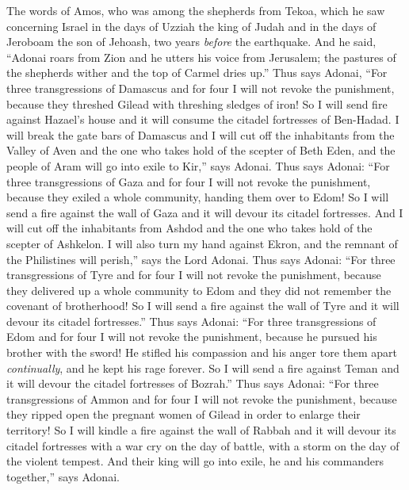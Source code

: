 
\begin{biblechapter} %
 The words of Amos, who was among the shepherds from Tekoa, which he saw concerning Israel in the days of Uzziah the king of Judah and in the days of Jeroboam the son of Jehoash, two years \textit{before} the earthquake.
 And he said, “Adonai roars from Zion and he utters his voice from Jerusalem; the pastures of the shepherds wither and the top of Carmel dries up.”
\verse Thus says Adonai, “For three transgressions of Damascus and for four I will not revoke the punishment, because they threshed Gilead with threshing sledges of iron!
\verse So I will send fire against Hazael’s house and it will consume the citadel fortresses of Ben-Hadad.
\verse I will break the gate bars of Damascus and I will cut off the inhabitants from the Valley of Aven and the one who takes hold of the scepter of Beth Eden, and the people of Aram will go into exile to Kir,” says Adonai.
\verse Thus says Adonai: “For three transgressions of Gaza and for four I will not revoke the punishment, because they exiled a whole community, handing them over to Edom!
\verse So I will send a fire against the wall of Gaza and it will devour its citadel fortresses.
\verse And I will cut off the inhabitants from Ashdod and the one who takes hold of the scepter of Ashkelon. I will also turn my hand against Ekron, and the remnant of the Philistines will perish,” says the Lord Adonai.
\verse Thus says Adonai: “For three transgressions of Tyre and for four I will not revoke the punishment, because they delivered up a whole community to Edom and they did not remember the covenant of brotherhood!
\verse So I will send a fire against the wall of Tyre and it will devour its citadel fortresses.”
\verse Thus says Adonai: “For three transgressions of Edom and for four I will not revoke the punishment, because he pursued his brother with the sword! He stifled his compassion and his anger tore them apart \textit{continually}, and he kept his rage forever.
\verse So I will send a fire against Teman and it will devour the citadel fortresses of Bozrah.”
\verse Thus says Adonai: “For three transgressions of Ammon and for four I will not revoke the punishment, because they ripped open the pregnant women of Gilead in order to enlarge their territory!
\verse So I will kindle a fire against the wall of Rabbah and it will devour its citadel fortresses with a war cry on the day of battle, with a storm on the day of the violent tempest.
\verse And their king will go into exile, he and his commanders together,” says Adonai.
\end{biblechapter}

